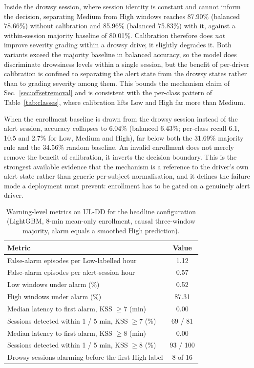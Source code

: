 \documentclass[journal]{IEEEtran}
\begin{document}
Inside the drowsy session, where session identity is constant and cannot inform
the decision, separating Medium from High windows reaches 87.90\% (balanced
78.66\%) without calibration and 85.96\% (balanced 75.83\%) with it, against a
within-session majority baseline of 80.01\%. Calibration therefore does
\emph{not} improve severity grading within a drowsy drive; it slightly degrades
it. Both variants exceed the majority baseline in balanced accuracy, so the model
does discriminate drowsiness levels within a single session, but the benefit of
per-driver calibration is confined to separating the alert state from the drowsy
states rather than to grading severity among them. This bounds the mechanism
claim of Sec.~\ref{sec:offsetremoval} and is consistent with the per-class
pattern of Table~\ref{tab:classes}, where calibration lifts Low and High far
more than Medium.

When the enrollment baseline is drawn from the drowsy session instead of the
alert session, accuracy collapses to 6.04\% (balanced 6.43\%; per-class recall
6.1, 10.5 and 2.7\% for Low, Medium and High), far below both the 31.69\%
majority rule and the 34.56\% random baseline. An invalid enrollment does not
merely remove the benefit of calibration, it inverts the decision boundary. This
is the strongest available evidence that the mechanism is a reference to the
driver's own alert state rather than generic per-subject normalisation, and it
defines the failure mode a deployment must prevent: enrollment has to be gated on
a genuinely alert driver.

\begin{table}[!t]
\caption{Warning-level metrics on UL-DD for the headline configuration
(LightGBM, 8-min mean-only enrollment, causal three-window majority, alarm
equals a smoothed High prediction).}
\label{tab:alarm}
\centering\footnotesize
\begin{tabular}{@{}lc@{}}
\toprule
Metric & Value \\
\midrule
False-alarm episodes per Low-labelled hour   & 1.12 \\
False-alarm episodes per alert-session hour  & 0.57 \\
Low windows under alarm (\%)                                & 0.52 \\
High windows under alarm (\%)                               & 87.31 \\
Median latency to first alarm, KSS $\ge 7$ (min) & 0.00 \\
Sessions detected within 1 / 5 min, KSS $\ge 7$ (\%) & 69 / 81 \\
Median latency to first alarm, KSS $\ge 8$ (min) & 0.00 \\
Sessions detected within 1 / 5 min, KSS $\ge 8$ (\%) & 93 / 100 \\
Drowsy sessions alarming before the first High label & 8 of 16 \\
\bottomrule
\end{tabular}
\end{table}
\end{document}
